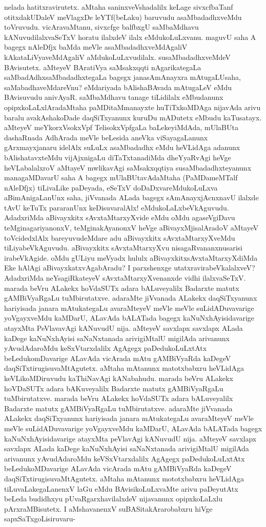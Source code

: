 nelada hatitxravirutetx. aMtaha saninxveVshadalilx keLage sivxcfbaTanf otitxdakUDaleV meVlagxDe leYTf(beLaku) baruvudu asaMbadadhxveMdu toVruvudu. vicAravaMtanu, sivxcfge balfbxgU saMbaMdhavu kANuvudilalxvaSeTxV horatu ilalxdeV ilalx eMdukoLuLxvanu. maguvU saha A bagegx nAleDfjx baMda meVle asaMbadadhxveMdAgaliV kAkataLiVyaveMdAgaliV aMdukoLuLxvudilalx. susaMbadadhxveMdeV BAvisutetx. aMteyeV BAratiVya saMsakxqqti nAgarikategaLa saMbadAdhxsaMbadadhxtegaLa bagegx janasAmAnayxra mAtugaLUsaha, saMabadhaveMdareVnu? eMdariyada bAlishaBAvada mAtugaLeV eMdu BAvisuvudu anivAyaR. saMbaMdhavu tanage tiLidilalx eMbudanunx opipxkoLaLxlAradaMtaha paMDitaMmanayxte huTiTxkoMDAga nijavAda arivu baralu avakAshakoDade daqSiTxyanunx kuruDu mADutetx  eMbudu kaTusatayx. aMteyeV  meYkorxVsokxVpf TelisokxVpfgaLa baLekeyiMdAda, mUlaBUta dashaRnada AdhArada meVle beLesida aneVka viSayagaLanunx gArxmayxjanaru idelAlx suLuLx asaMbadadhx eMdu heVLidAga adanunx bAlishatavxteMdu vijAjxnigaLu diTaTxtanadiMda dheYyaRvAgi heVge heVLabalalxroV aMtayeV mwlikavAgi saMsakxqqtiya susaMbadadhxteyanunx managaMDavarU saha A bagegx mUlaBUtavAdaMtaha (PaMDameMTalf nAleDfjx) tiLivaLike paDeyada, eSeTxV doDaDxvareMdukoLuLxva aBimAnigaLanUnx saha, jiVvanada ALada bagegx sAmAnayxjAcnxnavU ilalxde tAvU keTuTx pararanUnx keDisuvaralAlx! eMdukoLaLxbeVkAguvudu. AdadxriMda aBivayxkitx sAvxtaMtarxyXvide eMdu oMdu agaseVgiDavu teMginagariyanonxV, teMginakAyanonxV heVge aBivayxMjisalAradoV aMtayeV toVcidedxlAlx bareyuvudeMdare adu aBivayxkitx sAvxtaMtarxyXveMdu tiLiyabeVkAguvudu. aBivayxkitx sAvxtaMtarxyXvu nisagaRvananxnusarisi irabeVkAgide. oMdu gULiyu meVyadx hululx aBivayxkitxsAvxtaMtarxyXdiMda Eke hAlAgi aBivayxkatxvAgabAradu? I parxshenxge utatxravirabeVkalalxveV? AdadxriMda neYsagiRkateyeV sAvxtaMtarxyXvenanxde vidhi ilalxvaSeTxV. marada beVru ALakekx hoVdaSUTx adara bALuveyalilx Badarxte matutx gAMBiVyaRgaLu tuMbirutatxve. adaraMte jiVvanada ALakekx daqSiTxyanunx hariyisada janara mAtukategaLu avaraMteyeV meVle meVle suLidADuvavarige yoVgayxveMdu kaMDarU, ALavAda bALATada bagegx kaNuNxhAyisidavarige atayxMta PeVlavavAgi kANuvudU nija. aMteyeV savxlapx savxlapx ALada kaDege kaNuNxhAyisi saNaNxtanada arivigiMtalU migilAda arivanunx yAvudAdaroMdu keSxVtarxdalilx AgAgegx paDedukoLuLxtAtx beLedukomDavarige ALavAda vicArada mAtu gAMBiVyaRda kaDegeV daqSiTxtirugisuvaMtAgutetx. aMtaha mAtanunx matotxbabxru heVLidAga keVLikoMDiruvudu kaThiNavAgi kANabahudu. marada beVru ALakekx hoVDaSUTx adara bAKuveyalilx Badarxte matutx gAMBiVyaRgaLu tuMbirutatxve. marada beVru ALakekx hoVdaSUTx adara bALuveyalilx Badarxte matutx gAMBiVyaRgaLu tuMbirutatxve. adaraMte jiVvanada ALakekx daqSiTxyanunx hariyisada janara mAtukategaLu avaraMteyeV meVle meVle suLidADuvavarige yoVgayxveMdu kaMDarU, ALavAda bALATada bagegx kaNuNxhAyisidavarige atayxMta peVlavAgi kANuvudU nija. aMteyeV savxlapx savxlapx ALada kaDege kaNuNxhAyisi saNaNxtanada arivigiMtalU migilAda arivanunx yAvudAdaroMdu keVSxVtarxdalilx AgAgegx paDedukoLuLxtAtx beLedukoMDavarige ALavAda vicArada mAtu gAMBiVyaRda kaDegeV daqSiTxtirugisuvaMtAgutetx. aMtaha mAtanunx mototxbabxru heVLidAga tiLuvaLakegaLanenxV laGu eMdu BAvisikoLuLxvaMte arivu paDeyutAtx beLeda budidhxyu pUvaRgarxhavilalxdeV nijavanunx opipxkoLaLxlu pArxraMBisutetx. I aMshavanenxV suBASitakArarobabxru hiVge sapxSaTxgoLisiruvaru-
 
